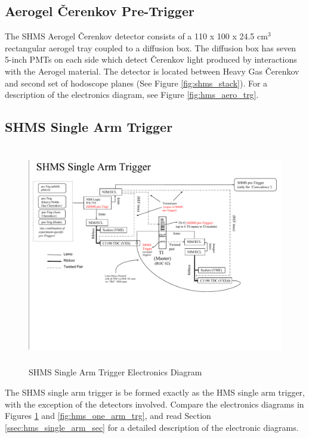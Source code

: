 \documentclass[11pt]{article}
\begin{document}
\subsection{Aerogel \v{C}erenkov Pre-Trigger}
\indent The SHMS Aerogel \v{C}erenkov detector consists of a 110 x 100 x 24.5 cm$^{3}$ rectangular aerogel tray coupled to a diffusion box. The diffusion box has seven 5-inch PMTs on each side
which detect \v{C}erenkov light produced by interactions with the Aerogel material\cite{shms_aero_article}. The detector is located between Heavy Gas \v{C}erenkov and second set of hodoscope planes
(See Figure \ref{fig:shms_stack}). For a description of the electronics diagram, see Figure \ref{fig:hms_aero_trg}.
\subsection{SHMS Single Arm Trigger}
\begin{figure}[h!]
  \centering
  \includegraphics[width=7.0in, height=3.8in]{SHMS_SingleArm_Trigger.pdf}
  \caption{SHMS Single Arm Trigger Electronics Diagram}
  \label{fig:shms_one_arm_trg}
\end{figure}

\indent The SHMS single arm trigger is be formed exactly as the HMS single arm trigger, with the exception of the detectors involved. Compare the electronics diagrams in Figures \ref{fig:shms_one_arm_trg} and
\ref{fig:hms_one_arm_trg}, and read Section \ref{ssec:hms_single_arm_sec} for a detailed description of the electronic diagrams. 
\end{document}
